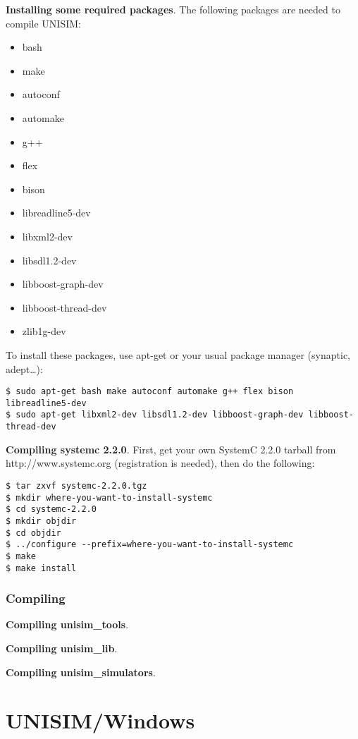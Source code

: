 \noindent \textbf{Installing some required packages}. The following packages are needed to compile UNISIM:
\begin{itemize}
\item bash
\item make
\item autoconf
\item automake
\item g++
\item flex
\item bison
\item libreadline5-dev
\item libxml2-dev
\item libsdl1.2-dev
\item libboost-graph-dev
\item libboost-thread-dev
\item zlib1g-dev
\end{itemize}

To install these packages, use apt-get or your usual package manager (synaptic, adept\ldots):
\begin{verbatim}
$ sudo apt-get bash make autoconf automake g++ flex bison libreadline5-dev
$ sudo apt-get libxml2-dev libsdl1.2-dev libboost-graph-dev libboost-thread-dev
\end{verbatim}

\noindent \textbf{Compiling systemc 2.2.0}. First, get your own SystemC 2.2.0 tarball from http://www.systemc.org (registration is needed), then do the following:

\begin{verbatim}
$ tar zxvf systemc-2.2.0.tgz
$ mkdir where-you-want-to-install-systemc
$ cd systemc-2.2.0
$ mkdir objdir
$ cd objdir
$ ../configure --prefix=where-you-want-to-install-systemc
$ make
$ make install
\end{verbatim}

\subsubsection{Compiling}

\noindent \textbf{Compiling unisim\_tools}.

\noindent \textbf{Compiling unisim\_lib}.

\noindent \textbf{Compiling unisim\_simulators}.

\section{UNISIM/Windows}
\label{compiling_unisim_for_windows}

